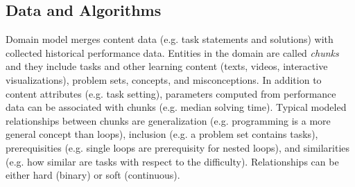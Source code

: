

\subsection{Data and Algorithms}

Domain model merges %
content data (e.g. task statements and solutions) %
with collected historical performance data.
Entities in the domain are called \emph{chunks} and they include tasks
and other learning content (texts, videos, interactive visualizations),
problem sets, concepts, and misconceptions.
In addition to content attributes (e.g. task setting), parameters computed
from performance data can be associated with chunks (e.g. median solving time).
Typical modeled relationships between chunks are
generalization (e.g. programming is a more general concept than loops),
inclusion (e.g. a problem set contains tasks),
prerequisities (e.g. single loops are prerequisity for nested loops),
and similarities (e.g. how similar are tasks with respect to the difficulty).
Relationships can be either hard (binary) or soft (continuous).

